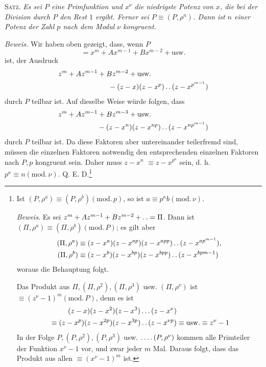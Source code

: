 \clearpage
{}
\textsc{Satz.} \emph{Es sei $P$ eine Primfunktion und $x^\nu$ die niedrigste Potenz von $x$, die bei der Division durch $P$ den Rest $1$ ergibt. Ferner sei $P\equiv(P,\rho^n)$. Dann ist $n$ einer Potenz der Zahl $p$ nach dem Modul $\nu$ kongruent.}

\emph{Beweis.} Wir haben oben gezeigt, dass, wenn $P$
\[
=x^m+Ax^{m-1}+Bx^{m-2}+\text{usw.}
\]
ist, der Ausdruck
\[
\begin{aligned}
z^m+Az^{m-1}+Bz^{m-2}+\text{usw.}\qquad\qquad\qquad\qquad&\\
{}-(z-x)(z-x^p)\mathinner{.\,.}(z-x^{p^{m-1}})&
\end{aligned}
\]
durch $P$ teilbar ist. Auf dieselbe Weise würde folgen, dass
\[
\begin{aligned}
z^m+Az^{m-1}+Bz^{m-3}+\text{usw.}\qquad\qquad\qquad\qquad&\\
{}-(z-x^n)(z-x^{np})\mathinner{.\,.}(z-x^{np^{m-1}})&
\end{aligned}
\]
durch $P$ teilbar ist. Da diese Faktoren aber untereinander teilerfremd sind, müssen die einzelnen Faktoren notwendig den entsprechenden einzelnen Faktoren nach $P,p$ kongruent sein. Daher muss $z-x^n$ $\equiv z-x^{p^\kappa}$ sein, d. h. $p^\kappa\equiv n(\mathrm{mod.}\,\nu)$. Q. E. D.\begingroup{}\relax\renewcommand{\thefootnote}{*)}\footnote{Ist $(P,\rho^a)\equiv(P,\rho^b)(\mathrm{mod.}\,p)$, so ist $a\equiv p^\kappa b(\mathrm{mod.}\,\nu)$.

\emph{Beweis.} Es sei $z^m+Az^{m-1}+Bz^{m-2}+\mathinner{.\,.}=\Pi$. Dann ist $(\Pi,\rho^a)\equiv(\Pi,\rho^b)(\mathrm{mod.}\,P)$; es gilt aber
\[
\begin{aligned}
(\Pi,\rho^a)&\equiv(z-x^a)(z-x^{ap})(z-x^{app})\mathinner{.\,.}(z-x^{ap^{m-1}}),\\
(\Pi,\rho^b)&\equiv(z-x^b)(z-x^{bp})(z-x^{bpp})\mathinner{.\,.}(z-x^{bpm-1})
\end{aligned}
\]
woraus die Behauptung folgt.

Das Produkt aus $\Pi,(\Pi,\rho^2),(\Pi,\rho^3)$ usw. $(\Pi,\rho^\nu)$ ist $\equiv(z^\nu-1)^m(\mathrm{mod.}\,P)$, denn es ist
\[
\begin{aligned}
(z-x)(z-x^2)(z-x^3)\ldots(z-x^\nu)&\\
{}\equiv(z-x^p)(z-x^{2p})(z-x^{3p})\mathinner{.\,.}(z-x^{\nu p})&\equiv\text{usw.}\equiv z^\nu-1
\end{aligned}
\]
In der Folge $P,(P,\rho^2),(P,\rho^3)$ usw. $\mathinner{.\,.\,.\,.}(P,\rho^\nu)$ kommen alle Primteiler der Funktion $x^\nu-1$ vor, und zwar jeder $m$ Mal. Daraus folgt, dass das Produkt aus allen $\equiv(x^\nu-1)^m$ ist.}\endgroup

